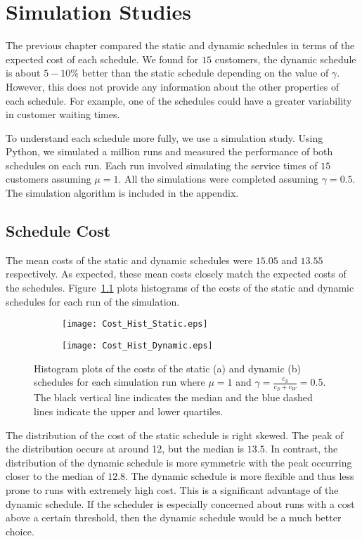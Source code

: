 \chapter{Simulation Studies}
\label{chap:Simulation}
The previous chapter compared the static and dynamic schedules in terms of the expected cost of each schedule. We found for $15$ customers, the dynamic schedule is about $5 - 10 \%$ better than the static schedule depending on the value of $\gamma$. However, this does not provide any information about the other properties of each schedule. For example, one of the schedules could have a greater variability in customer waiting times.

To understand each schedule more fully, we use a simulation study. Using Python, we simulated a million runs and measured the performance of both schedules on each run. Each run involved simulating the service times of $15$ customers assuming $\mu = 1$. All the simulations were completed assuming $\gamma = 0.5$. The simulation algorithm is included in the appendix.

\section{Schedule Cost}
The mean costs of the static and dynamic schedules were $15.05$ and $13.55$ respectively. As expected, these mean costs closely match the expected costs of the schedules. Figure~\ref{fig:Two_Cost} plots histograms of the costs of the static and dynamic schedules for each run of the simulation.
\begin{figure}[htb]
	\centering
	\begin{subfigure}[t]{0.45\textwidth}
		\centering
		\texttt{[image: Cost\_Hist\_Static.eps]}
		\caption{}
	\end{subfigure}
	\begin{subfigure}[t]{0.45\textwidth}
		\centering
		\texttt{[image: Cost\_Hist\_Dynamic.eps]}
		\caption{}
	\end{subfigure}
	\caption{Histogram plots of the costs of the static (a) and dynamic (b) schedules for each simulation run where $\mu = 1$ and $\gamma = \frac{c_{S}}{c_{S} + c_{W}} = 0.5$. The black vertical line indicates the median and the blue dashed lines indicate the upper and lower quartiles.}
	\label{fig:Two_Cost}
\end{figure}

The distribution of the cost of the static schedule is right skewed. The peak of the distribution occurs at around 12, but the median is $13.5$. In contrast, the distribution of the dynamic schedule is more symmetric with the peak occurring closer to the median of $12.8$. The dynamic schedule is more flexible and thus less prone to runs with extremely high cost. This is a significant advantage of the dynamic schedule. If the scheduler is especially concerned about runs with a cost above a certain threshold, then the dynamic schedule would be a much better choice.

